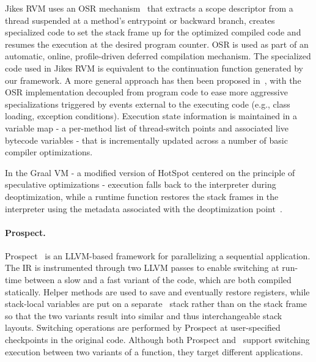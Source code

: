 
Jikes RVM uses an OSR mechanism~\cite{Fink03} that extracts a scope descriptor from a thread suspended at a method's entrypoint or backward branch, creates specialized code to set the stack frame up for the optimized compiled code and resumes the execution at the desired program counter.
OSR is used as part of an automatic, online, profile-driven deferred compilation mechanism. The specialized code used in Jikes RVM is equivalent to the continuation function generated by our framework. %
A more general approach has then been proposed in~\cite{Soman06}, with the OSR implementation decoupled from program code to ease more aggressive specializations triggered by events external to the executing code (e.g., class loading, exception conditions). Execution state information is maintained in a variable map - a per-method list of thread-switch points and associated live bytecode variables - that is incrementally updated across a number of basic compiler optimizations. %

In the Graal VM - a modified version of HotSpot centered on the principle of speculative optimizations - execution falls back to the interpreter during deoptimization, while a runtime function restores the stack frames in the interpreter using the metadata associated with the deoptimization point~\cite{Duboscq13,Wurthinger13,Duboscq14}.

\paragraph*{Prospect.} Prospect~\cite{Susskraut10} is an LLVM-based framework for parallelizing a sequential application. The IR is instrumented through two LLVM passes to enable switching at run-time between a slow and a fast variant of the code, which are both compiled statically. Helper methods are used to save and eventually restore registers, while stack-local variables are put on a separate \alloca\ stack rather than on the stack frame so that the two variants result into similar and thus interchangeable stack layouts.
Switching operations are performed by Prospect at user-specified checkpoints in the original code. Although both Prospect and \osrkit\ support switching execution between two variants of a function, they target different applications.

